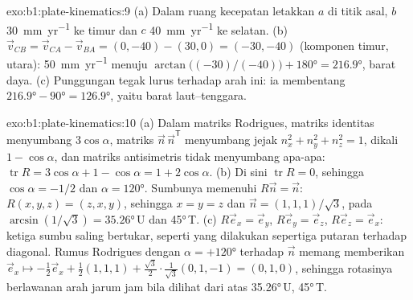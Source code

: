 \begin{solution}{exo:b1:plate-kinematics:9}
(a) Dalam ruang kecepatan letakkan $a$ di titik asal, $b$ \qty{30}{mm.yr^{-1}} ke
timur dan $c$ \qty{40}{mm.yr^{-1}} ke selatan. (b) $\vec v_{CB} =
\vec v_{CA} - \vec v_{BA} = (0, -40) - (30, 0) = (-30, -40)$ (komponen timur, utara):
\qty{50}{mm.yr^{-1}} menuju 
$\arctan\bigl((-30)/(-40)\bigr) + \ang{180} = \ang{216.9}$, barat daya. (c) Punggungan
tegak lurus terhadap arah ini: ia membentang
$\ang{216.9} - \ang{90} = \ang{126.9}$, yaitu barat laut--tenggara.
\end{solution}

\begin{solution}{exo:b1:plate-kinematics:10}
(a) Dalam matriks Rodrigues, matriks identitas menyumbang $3\cos\alpha$, matriks
$\vec n\,\vec n^{\mathsf T}$ menyumbang jejak $n_x^2 + n_y^2 + n_z^2 = 1$, dikali
$1 - \cos\alpha$, dan matriks antisimetris tidak menyumbang apa-apa: $\operatorname{tr}R =
3\cos\alpha + 1 - \cos\alpha = 1 + 2\cos\alpha$. (b) Di sini $\operatorname{tr}R = 0$,
sehingga $\cos\alpha = -1/2$ dan $\alpha = \ang{120}$. Sumbunya memenuhi $R\vec n =
\vec n$: $R(x, y, z) = (z, x, y)$, sehingga $x = y = z$ dan $\vec n =
(1, 1, 1)/\sqrt3$, pada  $\arcsin(1/\sqrt3) = \ang{35.26}$\,U dan
 \ang{45}\,T. (c) $R\vec e_x = \vec e_y$, $R\vec e_y = \vec e_z$,
$R\vec e_z = \vec e_x$: ketiga sumbu saling bertukar, seperti yang dilakukan sepertiga putaran terhadap diagonal. Rumus Rodrigues dengan $\alpha = +\ang{120}$ terhadap $\vec n$
memang memberikan $\vec e_x\mapsto -\tfrac12\vec e_x + \tfrac12(1, 1, 1) +
\tfrac{\sqrt3}{2}\cdot\tfrac{1}{\sqrt3}(0, 1, -1) = (0, 1, 0)$, sehingga rotasinya
berlawanan arah jarum jam bila dilihat dari atas \ang{35.26}\,U, \ang{45}\,T.
\end{solution}

